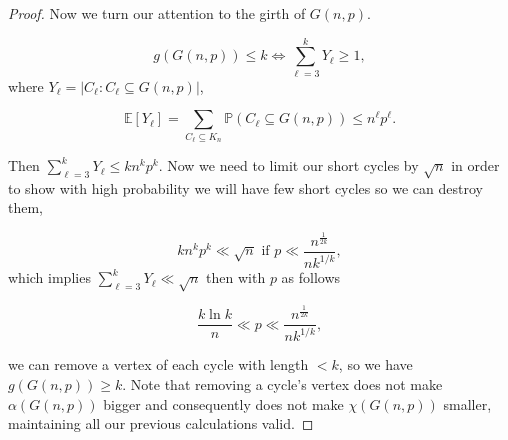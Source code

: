 \documentclass[12pt,twoside,a4paper,bibliography=totocnumbered]{book}
\numberwithin{equation}{section}
\let\log=\ln
\theoremstyle{remark}
\begin{document}
\begin{proof}
Now we turn our attention to the girth of $G(n,p)$.

$$ g(G(n,p)) \leq k \iff \sum_{\ell = 3}^k Y_{\ell} \geq 1,$$
where $Y_{\ell} = |C_{\ell} \colon C_{\ell} \subseteq G(n,p)|$,

$$\mathbb{E}[Y_{\ell}] = \sum_{C_{\ell} \subseteq K_n} \mathbb{P}(C_{\ell} \subseteq G(n,p) ) \leq n^{\ell}p^{\ell}.$$

Then $\sum_{\ell = 3}^k Y_{\ell} \leq kn^kp^k$. Now we need to limit our short cycles by $\sqrt{n}$ in order to show with high probability we will have few short cycles so we can destroy them,

$$kn^kp^k \ll \sqrt{n} \text{ if } p \ll \frac{n^{\frac{1}{2k}}}{nk^{1/k}},$$
which implies $\sum_{\ell = 3}^k Y_{\ell} \ll \sqrt{n}$ then with $p$ as follows

$$\frac{k\log k}{n} \ll p \ll \frac{n^{\frac{1}{2k}}}{nk^{1/k}},$$

we can remove a vertex of each cycle with length $<k$, so we have $g(G(n,p)) \geq k$. Note that removing a cycle's vertex does not make $\alpha(G(n,p))$ bigger and consequently does not make $\chi(G(n,p))$ smaller, maintaining all our previous calculations valid.
\end{proof}
\end{document}
